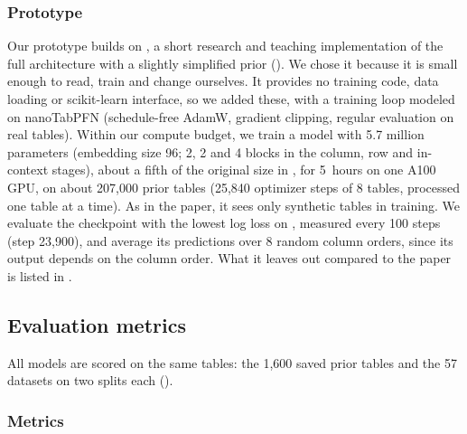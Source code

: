 \subsubsection{Prototype}\label{sec:prototype}

Our prototype builds on \nanotabicl{} \citep{nanotabicl}, a short research
and teaching implementation of the full \tabicl{} architecture with a
slightly simplified prior (). We chose it because it
is small enough to read, train and change ourselves. It provides no training
code, data loading or scikit-learn interface, so we added these, with a
training loop modeled on nanoTabPFN \citep{pfefferle2025nanotabpfn}
(schedule-free AdamW, gradient clipping, regular evaluation on real tables).
Within our compute budget, we train a model with 5.7 million parameters
(embedding size 96; 2, 2 and 4 blocks in the column, row and in-context
stages), about a fifth of the original \tabicl{} size in \nanotabicl{},
for 5~hours on one A100 GPU, on about 207{,}000 prior tables (25{,}840
optimizer steps of 8 tables, processed one table at a time). As in the paper, it sees only synthetic tables
in training. We evaluate the checkpoint with the lowest log loss on
\tabpfnval{}, measured every 100 steps (step 23{,}900), and average its
predictions over 8 random column orders, since its output depends on the
column order. What it leaves out compared to the paper is listed in
.

\subsection{Evaluation metrics}\label{sec:metrics}

All models are scored on the same tables: the 1{,}600 saved prior tables and
the 57 \tabpfnval{} datasets on two splits each ().

\subsubsection{Metrics}\label{sec:metric_definitions}

